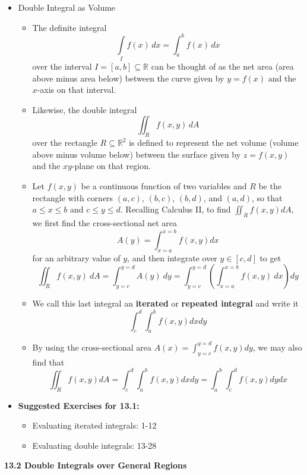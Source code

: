 \documentclass[12pt]{article}
\theoremstyle{plain}
\theoremstyle{definition}
\theoremstyle{remark}
\begin{document}
	\begin{itemize}
	
	\item Double Integral as Volume
	
		\begin{itemize}
		\item The definite integral \[\int\limits_I f(x)\, dx = \int_a^b f(x)\, dx\] over the interval $I=[a,b]\subseteq \mathbb{R}$ can be thought of as the net area (area above minus area below) between the curve given by $y=f(x)$ and the $x$-axis on that interval.
		\item Likewise, the double integral \[\iint_R f(x,y)\, dA\] over the rectangle $R \subseteq \mathbb{R}^2$ is defined to represent the net volume (volume above minus volume below) between the surface given by $z=f(x,y)$ and the $xy$-plane on that region.
		\item Let $f(x,y)$ be a continuous function of two variables and $R$ be the rectangle with corners $(a,c)$, $(b,c)$, $(b,d)$, and $(a,d)$, so that $a\leq x\leq b$ and $c\leq y\leq d$. Recalling Calculus II, to find $\iint_R f(x,y) dA$, we first find the cross-sectional net area \[A(y)=\int_{x=a}^{x=b} f(x,y) dx\] for an arbitrary value of $y$, and then integrate over $y\in[c,d]$ to get \[\iint_R f(x,y)\ dA = \int_{y=c}^{y=d} A(y)\ dy = \int_{y=c}^{y=d}\left(\int_{x=a}^{x=b} f(x,y)\ dx\right)dy\]
		\item We call this last integral an \textbf{iterated} or \textbf{repeated integral} and write it \[\int_c^d\int_a^b f(x,y)dxdy\]
		\item By using the cross-sectional area $A(x)=\int_{y=c}^{y=d} f(x,y) dy$, we may also find that \[\iint_R f(x,y) dA = \int_c^d\int_a^b f(x,y)dxdy = \int_a^b\int_c^d f(x,y)dydx\]
		\end{itemize}
		
	\item \textbf{Suggested Exercises for 13.1:}
	
		\begin{itemize}
		\item Evaluating iterated integrals: 1-12
		\item Evaluating double integrals: 13-28
		\end{itemize}
		
	\end{itemize}
	
	\newpage
	
	\centerline{\bf 13.2 Double Integrals over General Regions}
	
\end{document}
